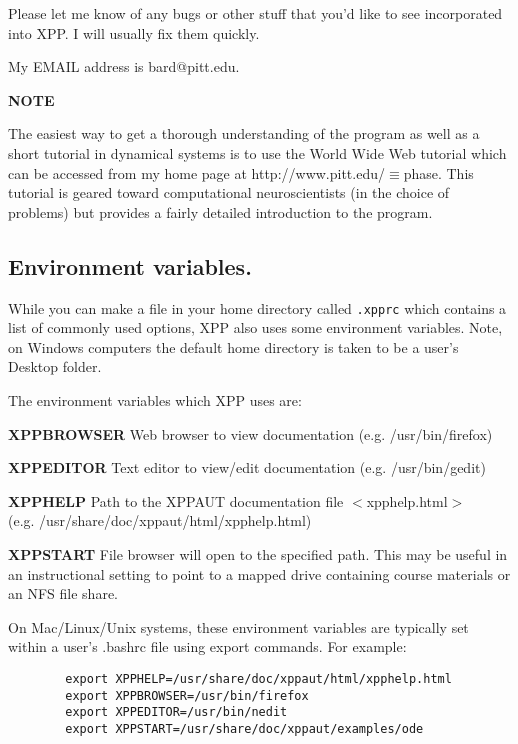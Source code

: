 \documentclass{article}
\newcommand{\tc}[1]{\addcontentsline{toc}{subsection}{#1}}
\begin{document}
Please let me know of any bugs or other stuff that you'd like to see
incorporated into XPP.  I will usually fix them quickly.

My EMAIL address is bard@pitt.edu.
\tc{World Wide Web Tutorial}
\begin{center}
{\bf NOTE}
\end{center}
The easiest way to get a thorough understanding of the program as well
as a short tutorial in dynamical systems is to use the World Wide Web
tutorial which can be accessed from my home page at
http://www.pitt.edu/$\equiv$phase. This tutorial is geared toward
computational neuroscientists (in the choice of problems) but provides
a fairly detailed introduction to the program.
\subsection{Environment variables.}
While you can make a file in your home
directory called {\tt .xpprc} which contains a list of commonly used
options, XPP also uses some environment variables.  Note, on Windows computers the default
 home directory is taken to be a user's Desktop folder.

The environment variables which XPP uses are:
\begin{description}
	\item{\ttfamily\textbf{XPPBROWSER}}
              Web browser to view documentation (e.g. /usr/bin/firefox)
	\item{\ttfamily\textbf{XPPEDITOR}}
              Text editor to view/edit documentation (e.g. /usr/bin/gedit)
	\item{\ttfamily\textbf{XPPHELP}}
              Path to  the  XPPAUT  documentation  file  $<$xpphelp.html$>$\\  (e.g.
              /usr/share/doc/xppaut/html/xpphelp.html)
	\item{\ttfamily\textbf{XPPSTART}}
              File browser will open to the specified path. This may be useful
              in  an instructional setting to point to a mapped drive containing
	      course materials or an NFS file share.

\end{description}



On Mac/Linux/Unix systems, these environment variables are typically set within a user's .bashrc file using export commands.  For example:
{\color{red}\begin{verbatim}
        export XPPHELP=/usr/share/doc/xppaut/html/xpphelp.html
        export XPPBROWSER=/usr/bin/firefox
        export XPPEDITOR=/usr/bin/nedit
        export XPPSTART=/usr/share/doc/xppaut/examples/ode
\end{verbatim}}
\end{document}
